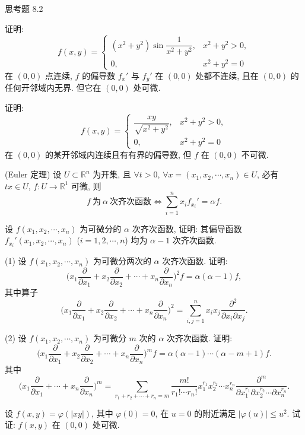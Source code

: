\begin{exblock}{思考题 8.2}
  \item 证明:
  \[
    f(x, y) = \begin{cases}
      (x^{2} + y^{2})\sin\dfrac{1}{x^{2} + y^{2}}, & x^{2} + y^{2} > 0, \\[2.5mm]
      0, & x^{2} + y^{2} = 0
    \end{cases}
  \]
  在 $(0, 0)$ 点连续, $f$ 的偏导数 $f_{x}'$ 与 $f_{y}'$ 在 $(0, 0)$ 处都不连续, 且在 $(0, 0)$ 的任何开邻域内无界. 但它在 $(0, 0)$ 处可微.

  \item 证明:
  \[
    f(x, y) = \begin{cases}
      \dfrac{xy}{\sqrt{x^{2} + y^{2}}}, & x^{2} + y^{2} > 0, \\[2.5mm]
      0, & x^{2} + y^{2} = 0
    \end{cases}
  \]
  在 $(0, 0)$ 的某开邻域内连续且有有界的偏导数, 但 $f$ 在 $(0, 0)$ 不可微.

  \item (Euler 定理) 设 $U \subset \mathbb{R}^{n}$ 为开集, 且 $\forall t > 0$, $\forall x = (x_{1}, x_{2}, \cdots, x_{n}) \in U$, 必有 $tx \in U$, $f: U \to \mathbb{R}^{1}$ 可微, 则
  \[
    f\ \text{为}\ \alpha\ \text{次齐次函数} \Leftrightarrow \sum_{i=1}^{n}x_{i}f_{x_{i}}' = \alpha f.
  \]

  \item 设 $f(x_{1}, x_{2}, \cdots, x_{n})$ 为可微分的 $\alpha$ 次齐次函数, 证明: 其偏导函数 $f_{x_{i}}'(x_{1}, x_{2}, \cdots, x_{n})$ ($i = 1, 2, \cdots, n$) 均为 $\alpha - 1$ 次齐次函数.

  \item (1) 设 $f(x_{1}, x_{2}, \cdots, x_{n})$ 为可微分两次的 $\alpha$ 次齐次函数. 证明:
  \[
    \Big(x_{1}\frac{\partial}{\partial x_{1}} + x_{2}\frac{\partial}{\partial x_{2}} + \cdots + x_{n}\frac{\partial}{\partial x_{n}}\Big)^{2}f = \alpha(\alpha - 1)f,
  \]
  其中算子
  \[
    \Big(x_{1}\frac{\partial}{\partial x_{1}} + x_{2}\frac{\partial}{\partial x_{2}} + \cdots + x_{n}\frac{\partial}{\partial x_{n}}\Big)^{2} = \sum_{i,j=1}^{n}x_{i}x_{j}\frac{\partial^{2}}{\partial x_{i}\partial x_{j}}.
  \]

  (2) 设 $f(x_{1}, x_{2}, \cdots, x_{n})$ 为可微分 $m$ 次的 $\alpha$ 次齐次函数. 证明:
  \[
    \Big(x_{1}\frac{\partial}{\partial x_{1}} + x_{2}\frac{\partial}{\partial x_{2}} + \cdots + x_{n}\frac{\partial}{\partial x_{n}}\Big)^{m}f = \alpha(\alpha - 1)\cdots(\alpha - m + 1)f.
  \]
  其中
  \[
    \Big(x_{1}\frac{\partial}{\partial x_{1}} + \cdots + x_{n}\frac{\partial}{\partial x_{n}}\Big)^{m} = \sum_{r_{1} + r_{2} + \cdots + r_{n} = m}\frac{m!}{r_{1}!\cdots r_{n}!}x_{1}^{r_{1}}x_{2}^{r_{2}}\cdots x_{n}^{r_{n}}\frac{\partial^{m}}{\partial x_{1}^{r_{1}}\partial x_{2}^{r_{2}}\cdots\partial x_{n}^{r_{n}}}.
  \]

  \item 设 $f(x, y) = \varphi(|xy|)$, 其中 $\varphi(0) = 0$, 在 $u = 0$ 的附近满足 $|\varphi(u)| \leqslant u^{2}$. 试证: $f(x, y)$ 在 $(0, 0)$ 处可微.
\end{exblock}

